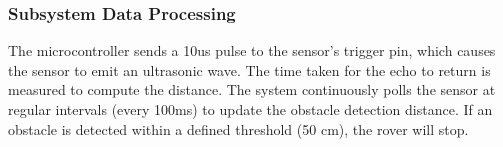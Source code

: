 \subsubsection{Subsystem Data Processing}
The microcontroller sends a 10us pulse to the sensor's trigger pin, which causes the sensor to emit an ultrasonic wave. The time taken for the echo to return is measured to compute the distance. The system continuously polls the sensor at regular intervals (every 100ms) to update the obstacle detection distance. If an obstacle is detected within a defined threshold (50 cm), the rover will stop.
